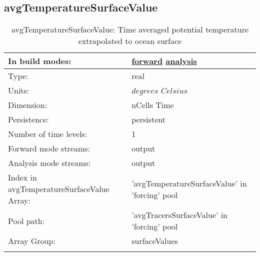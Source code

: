 \subsection[avgTemperatureSurfaceValue]{avgTemperatureSurfaceValue}
\label{subsec:var_sec_forcing_avgTemperatureSurfaceValue}
\begin{center}
\begin{longtable}{| p{2.0in} | p{4.0in} |}
        \hline 
        In build modes: & \hyperref[subsec:forward_var_tab_forcing]{forward} \hyperref[subsec:analysis_var_tab_forcing]{analysis} \\
        \hline 
        Type: & real \\
        \hline 
        Units: & $degrees$ $Celsius$ \\
        \hline 
        Dimension: & nCells Time \\
        \hline 
        Persistence: & persistent \\
        \hline 
        Number of time levels: & 1 \\
        \hline 
		 Forward mode streams: &  output \\
        \hline 
		 Analysis mode streams: &  output \\
        \hline 
		 Index in avgTemperatureSurfaceValue Array: & 'avgTemperatureSurfaceValue' in 'forcing' pool \\
		 \hline 
            Pool path: & 'avgTracersSurfaceValue' in 'forcing' pool
 \\
		 \hline 
		 Array Group: & surfaceValues \\
		 \hline 
    \caption{avgTemperatureSurfaceValue: Time averaged potential temperature extrapolated to ocean surface}
\end{longtable}
\end{center}

